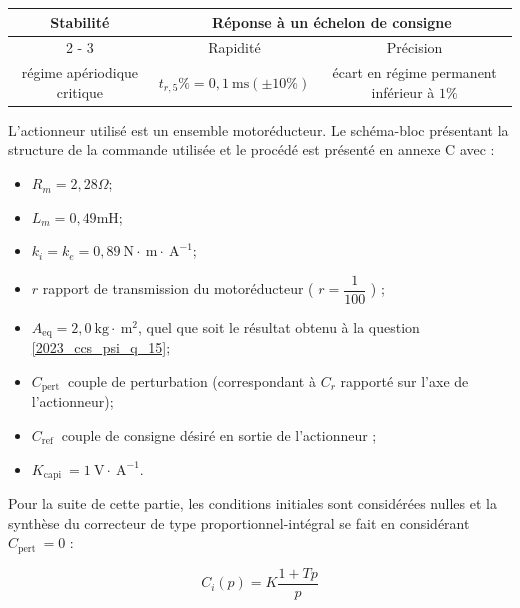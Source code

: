 \begin{center}
\begin{tabular}{|c|c|c|}
\hline
\multirow{2}{*}{Stabilité} & \multicolumn{2}{|c|}{Réponse à un échelon de consigne} \\
\cline { 2 - 3 }
 & Rapidité & Précision \\
\hline
régime apériodique critique & $t_{r, 5} \%=0,1 \mathrm{~ms}( \pm 10 \%)$ & écart en régime permanent inférieur à $1 \%$ \\
\hline
\end{tabular}
\end{center}

L'actionneur utilisé est un ensemble motoréducteur. Le schéma-bloc présentant la structure de la commande utilisée et le procédé est présenté en annexe C avec :

\begin{itemize}
  \item $R_{m}=2,28 \Omega$;
  \item $L_{m}=0,49 \mathrm{mH}$;
  \item $k_{i}=k_{e}=0,89 \mathrm{~N} \cdot \mathrm{~m} \cdot \mathrm{~A}^{-1}$;
  \item $r$ rapport de transmission du motoréducteur ( $r=\dfrac{1}{100}$ ) ;
  \item $A_{\mathrm{eq}}=2,0 \mathrm{~kg} \cdot \mathrm{~m}^{2}$, quel que soit le résultat obtenu à la question \ref{2023_ccs_psi_q_15};
  \item $C_{\text {pert }}$ couple de perturbation (correspondant à $C_{r}$ rapporté sur l'axe de l'actionneur);
  \item $C_{\text {ref }}$ couple de consigne désiré en sortie de l'actionneur ;
  \item $K_{\text {capi }}=1 \mathrm{~V} \cdot \mathrm{~A}^{-1}$.
\end{itemize}

Pour la suite de cette partie, les conditions initiales sont considérées nulles et la synthèse du correcteur de type proportionnel-intégral se fait en considérant $C_{\text {pert }}=0$ :

$$
C_{i}(p)=K \dfrac{1+T p}{p}
$$

\fi

